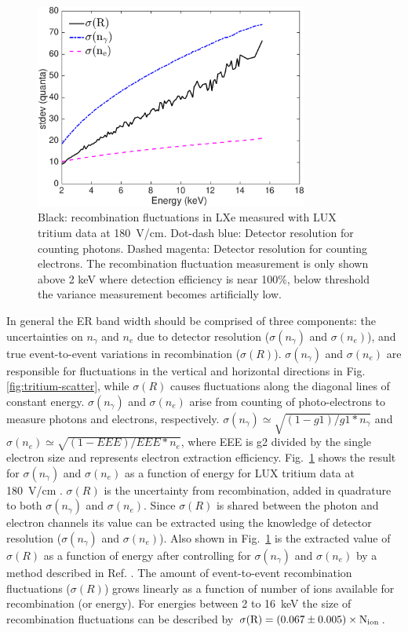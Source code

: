 \begin{figure}[t!]
\includegraphics[width=90mm]{fig12.pdf}
\caption{Black: recombination fluctuations in LXe measured with LUX tritium data at 180~V/cm. Dot-dash blue: Detector resolution for counting photons. Dashed magenta: Detector resolution for counting electrons. The recombination fluctuation measurement is only shown above 2 keV where detection efficiency is near 100\%, below threshold the variance measurement becomes artificially low.}
\label{fig:recomb-flucs}
\end{figure}


In general the ER band width should be comprised of three components: the uncertainties on  $n_{\gamma}$ and $n_e$  due to detector resolution ($ \sigma(n_{\gamma})$ and $ \sigma(n_e)$), and true event-to-event variations in recombination ($ \sigma(R)$). $ \sigma(n_{\gamma})$ and $ \sigma(n_e)$ are responsible for fluctuations in the vertical  and horizontal directions in Fig. \ref{fig:tritium-scatter},  while $ \sigma(R)$ causes fluctuations along the diagonal lines of constant energy.  $ \sigma(n_{\gamma})$ and $ \sigma(n_e)$ arise from counting of photo-electrons to measure photons and electrons, respectively. $ \sigma(n_{\gamma})\simeq \sqrt{(1-g1)/g1*n_\gamma}$ and $ \sigma(n_{e})\simeq \sqrt{(1-EEE)/EEE*n_e}$, where EEE is g2 divided by the single electron size and represents electron extraction efficiency. Fig.~\ref{fig:recomb-flucs} shows the result for $ \sigma(n_{\gamma})$ and $ \sigma(n_e)$ as a function of energy for LUX tritium data at 180~V/cm \cite{Dobi_Thesis}.  $ \sigma(R)$ is the uncertainty from recombination, added in quadrature to both $ \sigma(n_{\gamma})$ and $ \sigma(n_e)$. Since $ \sigma(R)$ is shared between the photon and electron channels its value can be extracted using the knowledge of detector resolution ($ \sigma(n_{\gamma})$ and $ \sigma(n_e)$). Also shown in Fig.~\ref{fig:recomb-flucs} is the extracted value of $ \sigma(R)$ as a function of energy after controlling for $ \sigma(n_{\gamma})$ and $ \sigma(n_e)$ by a method described in Ref. \cite{Dobi_Thesis}. The amount of event-to-event recombination fluctuations ($ \sigma(R)$) grows linearly as a function of number of ions available for recombination (or energy). For energies between 2 to 16~keV the size of recombination fluctuations can be described by $\rm \sigma(R)=(0.067\pm0.005) \times N_{ion}$.


